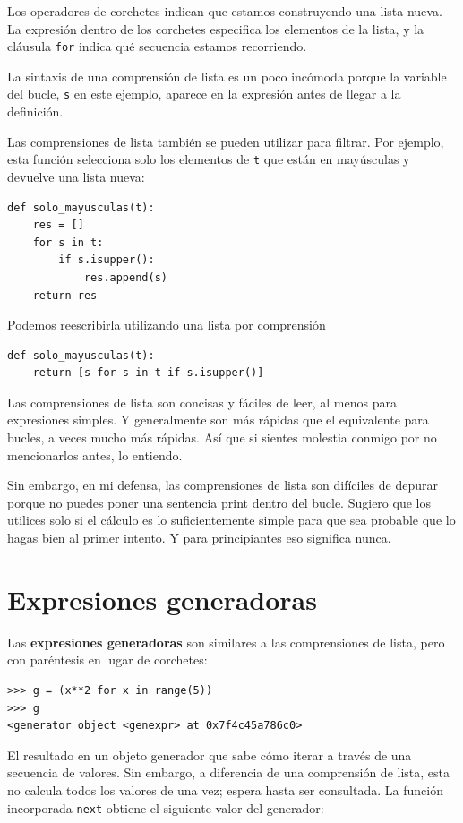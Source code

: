 \documentclass[10pt]{book}
\begin{document}
Los operadores de corchetes indican que estamos construyendo una lista
nueva.  La expresión dentro de los corchetes especifica los elementos
de la lista, y la cláusula {\tt for} indica qué secuencia
estamos recorriendo.

La sintaxis de una comprensión de lista es un poco incómoda porque
la variable del bucle, {\tt s} en este ejemplo, aparece en la expresión
antes de llegar a la definición.

Las comprensiones de lista también se pueden utilizar para filtrar.  Por ejemplo,
esta función selecciona solo los elementos de {\tt t} que están
en mayúsculas y devuelve una lista nueva:

\begin{verbatim}
def solo_mayusculas(t):
    res = []
    for s in t:
        if s.isupper():
            res.append(s)
    return res
\end{verbatim}

Podemos reescribirla utilizando una lista por comprensión

\begin{verbatim}
def solo_mayusculas(t):
    return [s for s in t if s.isupper()]
\end{verbatim}

Las comprensiones de lista son concisas y fáciles de leer, al menos para expresiones
simples.  Y generalmente son más rápidas que el equivalente para
bucles, a veces mucho más rápidas.  Así que si sientes molestia conmigo por no
mencionarlos antes, lo entiendo.

Sin embargo, en mi defensa, las comprensiones de lista son difíciles de depurar porque
no puedes poner una sentencia print dentro del bucle.  Sugiero que los
utilices solo si el cálculo es lo suficientemente simple para que sea probable
que lo hagas bien al primer intento.  Y para principiantes eso significa nunca.



\section{Expresiones generadoras}

Las {\bf expresiones generadoras} son similares a las comprensiones de lista, pero
con paréntesis en lugar de corchetes:

\begin{verbatim}
>>> g = (x**2 for x in range(5))
>>> g
<generator object <genexpr> at 0x7f4c45a786c0>
\end{verbatim}
%
El resultado en un objeto generador que sabe cómo iterar a través de
una secuencia de valores.  Sin embargo, a diferencia de una comprensión de lista, esta no
calcula todos los valores de una vez; espera hasta ser consultada.  La función
incorporada {\tt next} obtiene el siguiente valor del generador:
\end{document}
